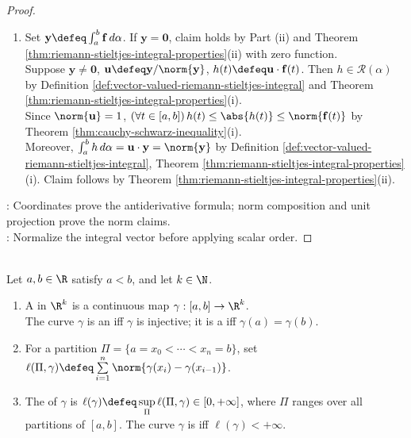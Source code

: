 \begin{theorem}
\begin{proof}
\begin{enumerate}[label=(\roman*)]
\item Set $\mathbf{y}\defeq\int_a^b\mathbf{f}\,d\alpha$. If $\mathbf{y}=\mathbf{0}$,  claim holds by Part (ii) and Theorem \ref{thm:riemann-stieltjes-integral-properties}(ii) with zero function.\\
Suppose $\mathbf{y}\neq\mathbf{0}$, $\mathbf{u}\defeq\mathbf{y}/\norm{\mathbf{y}}$, $h(t)\defeq\mathbf{u}\cdot\mathbf{f}(t)$. Then $h\in\mathcal{R}(\alpha)$ by Definition \ref{def:vector-valued-riemann-stieltjes-integral} and Theorem \ref{thm:riemann-stieltjes-integral-properties}(i).\\
Since $\norm{\mathbf{u}}=1$, $(\forall t\in[a,b])\,h(t)\leq\abs{h(t)}\leq\norm{\mathbf{f}(t)}$ by Theorem \ref{thm:cauchy-schwarz-inequality}(i).\\
Moreover, $\int_a^b h\,d\alpha=\mathbf{u}\cdot\mathbf{y}=\norm{\mathbf{y}}$ by Definition \ref{def:vector-valued-riemann-stieltjes-integral}, Theorem \ref{thm:riemann-stieltjes-integral-properties}(i). Claim follows by Theorem \ref{thm:riemann-stieltjes-integral-properties}(ii).
\end{enumerate}
: Coordinates prove the antiderivative formula; norm composition and unit projection prove the norm claims.\\
: Normalize the integral vector before applying scalar order.
\end{proof}
\end{theorem}

\begin{definition} \label{def:curves-and-rectifiability} \\
Let $a,b\in\R$ satisfy $a<b$, and let $k\in\N$.
\begin{enumerate}[label=(\roman*)]
\setlength{\itemsep}{0pt}
\item A  in $\R^k$ is a continuous map $\gamma:[a,b]\to\R^k$.\\
The curve $\gamma$ is an  iff $\gamma$ is injective; it is a  iff $\gamma(a)=\gamma(b)$.
\item For a partition $\Pi=\{a=x_0<\cdots<x_n=b\}$, set $\ell(\Pi,\gamma)\defeq\sum\limits_{i=1}^{n}\norm{\gamma(x_i)-\gamma(x_{i-1})}$.
\item The  of $\gamma$ is $\ell(\gamma)\defeq\sup\limits_{\Pi}\ell(\Pi,\gamma)\in[0,+\infty]$, where $\Pi$ ranges over all partitions of $[a,b]$. The curve $\gamma$ is  iff $\ell(\gamma)<+\infty$.
\end{enumerate}
\end{definition}

